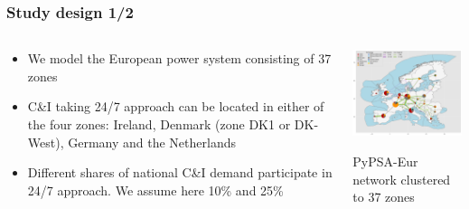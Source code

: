 \begin{frame}
  \frametitle{Study design 1/2}

\begin{columns}[T]
\begin{column}{6cm}

  \begin{itemize}

  \item We model the European power system consisting of \alert{37 zones}
  \item C\&I taking 24/7 approach can be located in either of the \alert{four zones}: Ireland, Denmark (zone DK1 or DK-West), Germany and the Netherlands
  \item Different shares of national C\&I demand participate in 24/7 approach. We assume here \alert{10\%} and \alert{25\%}
  \end{itemize}

\end{column}

\begin{column}{8cm}

\centering
\includegraphics[width=8cm]{images/elec_s_37.png}

\vspace{0.1cm}
PyPSA-Eur network clustered to 37 zones

\end{column}
\end{columns}

\end{frame}


